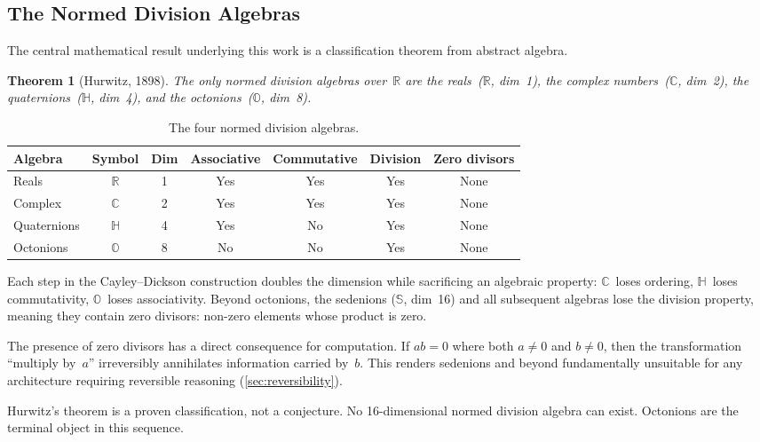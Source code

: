 \documentclass[11pt,a4paper]{article}
\newtheorem{theorem}{Theorem}[section]
\newcommand{\Oct}{\mathbb{O}}
\newcommand{\Real}{\mathbb{R}}
\newcommand{\Comp}{\mathbb{C}}
\newcommand{\Quat}{\mathbb{H}}
\newcommand{\Sed}{\mathbb{S}}
\begin{document}
\subsection{The Normed Division Algebras}
\label{sec:nda}

The central mathematical result underlying this work is a classification theorem from abstract algebra.

\begin{theorem}[Hurwitz, 1898]
The only normed division algebras over~$\Real$ are the reals~($\Real$, dim~1), the complex numbers~($\Comp$, dim~2), the quaternions~($\Quat$, dim~4), and the octonions~($\Oct$, dim~8).
\end{theorem}

\begin{table}[ht]
\centering
\caption{The four normed division algebras.}
\label{tab:nda}
\begin{tabular}{@{}lcccccc@{}}
\toprule
Algebra & Symbol & Dim & Associative & Commutative & Division & Zero divisors \\
\midrule
Reals       & $\Real$ & 1 & Yes & Yes & Yes & None \\
Complex     & $\Comp$ & 2 & Yes & Yes & Yes & None \\
Quaternions & $\Quat$ & 4 & Yes & No  & Yes & None \\
Octonions   & $\Oct$  & 8 & No  & No  & Yes & None \\
\bottomrule
\end{tabular}
\end{table}

Each step in the Cayley--Dickson construction doubles the dimension while sacrificing an algebraic property: $\Comp$~loses ordering, $\Quat$~loses commutativity, $\Oct$~loses associativity. Beyond octonions, the sedenions ($\Sed$, dim~16) and all subsequent algebras lose the division property, meaning they contain zero divisors: non-zero elements whose product is zero.

The presence of zero divisors has a direct consequence for computation. If $ab = 0$ where both $a \neq 0$ and $b \neq 0$, then the transformation ``multiply by~$a$'' irreversibly annihilates information carried by~$b$. This renders sedenions and beyond fundamentally unsuitable for any architecture requiring reversible reasoning (\cref{sec:reversibility}).

Hurwitz's theorem is a proven classification, not a conjecture. No 16-dimensional normed division algebra can exist. Octonions are the terminal object in this sequence.
\end{document}
